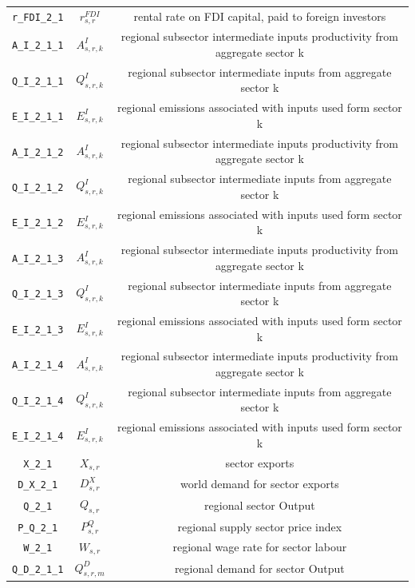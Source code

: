 \begin{center}
\begin{longtable}{ccc}
\texttt{r\_FDI\_2\_1} & ${r^{FDI}_{s,r}}$ & rental rate on FDI capital, paid to foreign investors\\
\texttt{A\_I\_2\_1\_1} & ${A^{I}_{s,r,k}}$ & regional subsector intermediate inputs productivity from aggregate sector k\\
\texttt{Q\_I\_2\_1\_1} & ${Q^{I}_{s,r,k}}$ & regional subsector intermediate inputs from aggregate sector k\\
\texttt{E\_I\_2\_1\_1} & ${E^I_{s,r,k}}$ & regional emissions associated with inputs used form sector k\\
\texttt{A\_I\_2\_1\_2} & ${A^{I}_{s,r,k}}$ & regional subsector intermediate inputs productivity from aggregate sector k\\
\texttt{Q\_I\_2\_1\_2} & ${Q^{I}_{s,r,k}}$ & regional subsector intermediate inputs from aggregate sector k\\
\texttt{E\_I\_2\_1\_2} & ${E^I_{s,r,k}}$ & regional emissions associated with inputs used form sector k\\
\texttt{A\_I\_2\_1\_3} & ${A^{I}_{s,r,k}}$ & regional subsector intermediate inputs productivity from aggregate sector k\\
\texttt{Q\_I\_2\_1\_3} & ${Q^{I}_{s,r,k}}$ & regional subsector intermediate inputs from aggregate sector k\\
\texttt{E\_I\_2\_1\_3} & ${E^I_{s,r,k}}$ & regional emissions associated with inputs used form sector k\\
\texttt{A\_I\_2\_1\_4} & ${A^{I}_{s,r,k}}$ & regional subsector intermediate inputs productivity from aggregate sector k\\
\texttt{Q\_I\_2\_1\_4} & ${Q^{I}_{s,r,k}}$ & regional subsector intermediate inputs from aggregate sector k\\
\texttt{E\_I\_2\_1\_4} & ${E^I_{s,r,k}}$ & regional emissions associated with inputs used form sector k\\
\texttt{X\_2\_1} & ${X_{s,r}}$ & sector exports\\
\texttt{D\_X\_2\_1} & ${D^{X}_{s,r}}$ & world demand for sector exports\\
\texttt{Q\_2\_1} & ${Q_{s,r}}$ & regional sector Output\\
\texttt{P\_Q\_2\_1} & ${P^Q_{s,r}}$ & regional supply sector price index\\
\texttt{W\_2\_1} & ${W_{s,r}}$ & regional wage rate for sector labour\\
\texttt{Q\_D\_2\_1\_1} & ${Q^D_{s,r,m}}$ & regional demand for sector Output\\

\end{longtable}
\end{center}
